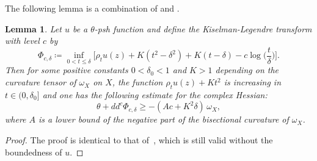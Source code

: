 \documentclass[a4paper,11pt]{amsart}
\numberwithin{equation}{section}
\newtheorem{lemma}[theorem]{Lemma}
\theoremstyle{definition}
\newcommand{\exph}{{\rm exph}}
\begin{document}
  
The following lemma is a combination of \cite[Theorem 4.1]{demailly1994regularization} and \cite[Lemma 1.12]{berman2012regularity}.
\begin{lemma}\label{lem kiselman}
	Let $u$ be a $\theta$-psh function and define the Kiselman-Legendre transform with level $c$ by
	\begin{equation}\label{kisleg}
	\Phi_{c,\delta}\coloneqq\inf _{0< t\leq \delta }\Big[\rho_tu(z)+K (t^2-\delta^2)+K (t-\delta)
	-c\log\Big(\frac t{\delta}\Big)\Big].
	\end{equation}	
	Then for  some positive constants $0<\delta_0<1$ and $K>1$  depending on the curvature tensor of $\omega_X$ on $X$,
	 the function $\rho_tu(z)+Kt^2$ is increasing in $t\in (0, \delta_0]$ and
	one has the following estimate for the complex Hessian:
	\begin{equation}\label{hessest}
	\theta+dd^c \Phi_{c,\delta}\geq -(Ac+K^2\delta)\,\omega_X,
	\end{equation}
	where $A$ is a lower bound of the negative part of the bisectional curvature of $\omega_X$.
\end{lemma}
  \begin{proof} 
 The proof is identical to that of~\cite[Lemma 4.1]{kolodziej2019stability}, which is still valid without the boundedness of $u$.
 \end{proof}
\end{document}
